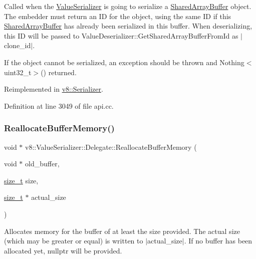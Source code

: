 Called when the \mbox{\hyperlink{classv8_1_1ValueSerializer}{Value\+Serializer}} is going to serialize a \mbox{\hyperlink{classv8_1_1SharedArrayBuffer}{Shared\+Array\+Buffer}} object. The embedder must return an ID for the object, using the same ID if this \mbox{\hyperlink{classv8_1_1SharedArrayBuffer}{Shared\+Array\+Buffer}} has already been serialized in this buffer. When deserializing, this ID will be passed to Value\+Deserializer\+::\+Get\+Shared\+Array\+Buffer\+From\+Id as $\vert$clone\+\_\+id$\vert$.

If the object cannot be serialized, an exception should be thrown and Nothing$<$uint32\+\_\+t$>$() returned. 

Reimplemented in \mbox{\hyperlink{classv8_1_1Serializer_a573f904a1db660126a98ecec16f142be}{v8\+::\+Serializer}}.



Definition at line 3049 of file api.\+cc.

\mbox{\label{classv8_1_1ValueSerializer_1_1Delegate_ade3ce68ebf5a3f3eba2f8f091177f155}} 
\subsubsection{\texorpdfstring{Reallocate\+Buffer\+Memory()}{ReallocateBufferMemory()}}
{\footnotesize\ttfamily void $\ast$ v8\+::\+Value\+Serializer\+::\+Delegate\+::\+Reallocate\+Buffer\+Memory (\begin{DoxyParamCaption}\item[{void $\ast$}]{old\+\_\+buffer,  }\item[{\mbox{\hyperlink{classsize__t}{size\+\_\+t}}}]{size,  }\item[{\mbox{\hyperlink{classsize__t}{size\+\_\+t}} $\ast$}]{actual\+\_\+size }\end{DoxyParamCaption})\hspace{0.3cm}{\ttfamily [virtual]}}

Allocates memory for the buffer of at least the size provided. The actual size (which may be greater or equal) is written to $\vert$actual\+\_\+size$\vert$. If no buffer has been allocated yet, nullptr will be provided.

